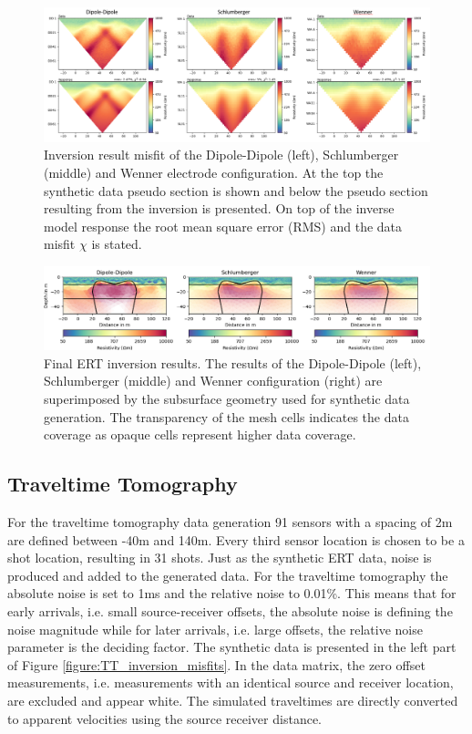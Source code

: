 \begin{figure}[H]
  \centering
    \includegraphics[width=\textwidth]{Figures/ERT_inversion_overview.png}
    \caption[ERT inversion result misfit]{Inversion result misfit of the Dipole-Dipole (left), Schlumberger (middle) and Wenner electrode configuration. At the top the synthetic data pseudo section is shown and below the pseudo section resulting from the inversion is presented. On top of the inverse model response the root mean square error (RMS) and the data misfit $\chi$ is stated.}
    \label{figure:ERT_inversion_misfits}
\end{figure}

\begin{figure}[H]
  \centering
    \includegraphics[width=\textwidth]{Figures/ERT_Inv_comp.png}
    \caption[Final resistivity models after inversion]{Final ERT inversion results. The results of the Dipole-Dipole (left), Schlumberger (middle) and Wenner configuration (right) are superimposed by the subsurface geometry used for synthetic data generation. The transparency of the mesh cells indicates the data coverage as opaque cells represent higher data coverage.}
    \label{figure:ERT_inversion_comp}
\end{figure}

\subsection{Traveltime Tomography}\label{section:Res_TT}

For the traveltime tomography data generation 91 sensors with a spacing of 2m are defined between -40m and 140m. Every third sensor location is chosen to be a shot location, resulting in 31 shots. Just as the synthetic ERT data, noise is produced and added to the generated data. For the traveltime tomography the absolute noise is set to 1ms and the relative noise to 0.01\%. This means that for early arrivals, i.e. small source-receiver offsets, the absolute noise is defining the noise magnitude while for later arrivals, i.e. large offsets, the relative noise parameter is the deciding factor. The synthetic data is presented in the left part of Figure \ref{figure:TT_inversion_misfits}. In the data matrix, the zero offset measurements, i.e. measurements with an identical source and receiver location, are excluded and appear white. The simulated traveltimes are directly converted to apparent velocities using the source receiver distance.

